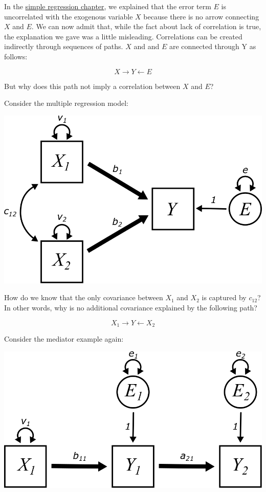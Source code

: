 \documentclass[
]{book}
\begin{document}
In the \protect\hyperlink{simple}{simple regression chapter}, we explained that the error term \(E\) is uncorrelated with the exogenous variable \(X\) because there is no arrow connecting \(X\) and \(E\). We can now admit that, while the fact about lack of correlation is true, the explanation we gave was a little misleading. Correlations can be created indirectly through sequences of paths. \(X\) and and \(E\) are connected through Y as follows:

\[
X \boldsymbol{\rightarrow} Y \boldsymbol{\leftarrow} E
\]

But why does this path not imply a correlation between \(X\) and \(E\)?

Consider the multiple regression model:

\begin{center}\includegraphics{graphics/multiple_regression_2} \end{center}

How do we know that the only covariance between \(X_{1}\) and \(X_{2}\) is captured by \(c_{12}\)? In other words, why is no additional covariance explained by the following path?

\[
X_{1} \boldsymbol{\rightarrow} Y \boldsymbol{\leftarrow} X_{2}
\]

Consider the mediator example again:

\begin{center}\includegraphics{graphics/mediator_vars} \end{center}
\end{document}
